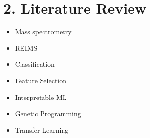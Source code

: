 \documentclass[11pt, a4paper, twoside, openright]{report}
\begin{document}
\section*{2. Literature Review}






\begin{itemize}
  \item Mass spectrometry \cite{eder1995gas}
  \item REIMS 
  \item Classification 
  \item Feature Selection 
  \item Interpretable ML 
  \item Genetic Programming 
  \item Transfer Learning 
\end{itemize}
\end{document}

